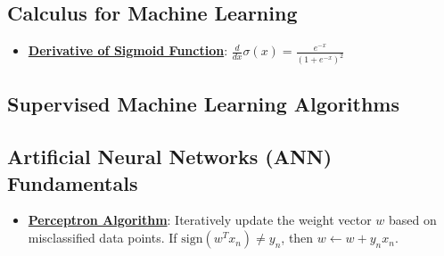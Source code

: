 \documentclass{article}%
\begin{document}
%
\subsection{Calculus for Machine Learning}%
\label{subsec:CalculusforMachineLearning}%
\begin{itemize}[leftmargin=*]%
\item \href{https://purdue.brightspace.com/d2l/common/assets/pdfjs-d2l-dist/1.0.14-legacy/web/viewer.html?file=%2Fcontent%2Fenforced%2F1095467-wl.202510.CS.24300.001%2F04L1-Linear Algebra Primer.pdf%3Fou%3D1095467&lang=en-us&container=d2l-fileviewer-rendered-pdf&fullscreen=d2l-fileviewer-rendered-pdf-dialog&height=667#page=21}{\textbf{Derivative of Sigmoid Function}}: $\frac{d}{dx} \sigma(x) = \frac{e^{-x}}{(1 + e^{-x})^2}$%
\end{itemize}

%
\subsection{Supervised Machine Learning Algorithms}%
\label{subsec:SupervisedMachineLearningAlgorithms}%
\begin{itemize}[leftmargin=*]%
%
\end{itemize}

%
\subsection{Artificial Neural Networks (ANN) Fundamentals}%
\label{subsec:ArtificialNeuralNetworks(ANN)Fundamentals}%
\begin{itemize}[leftmargin=*]%
\item \href{https://purdue.brightspace.com/d2l/common/assets/pdfjs-d2l-dist/1.0.14-legacy/web/viewer.html?file=%2Fcontent%2Fenforced%2F1095467-wl.202510.CS.24300.001%2F05L2-ML Basics.pdf%3Fou%3D1095467&lang=en-us&container=d2l-fileviewer-rendered-pdf&fullscreen=d2l-fileviewer-rendered-pdf-dialog&height=667#page=30}{\textbf{Perceptron Algorithm}}: Iteratively update the weight vector $w$ based on misclassified data points. If $\text{sign}(w^Tx_n) \ne y_n$, then $w \leftarrow w + y_nx_n$.%
\end{itemize}

%
\end{document}
